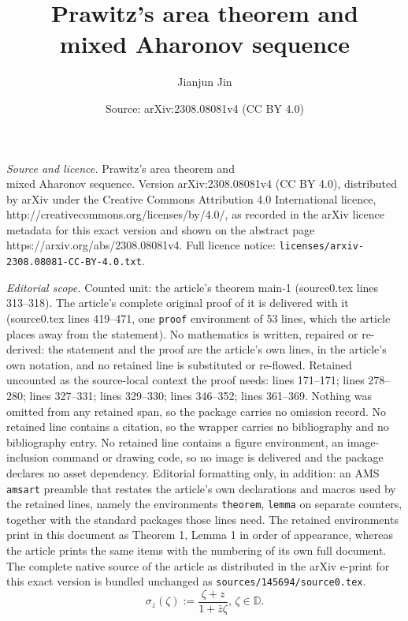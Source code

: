 \documentclass[10pt,a4paper]{amsart}
\title{Prawitz's area theorem and \\ mixed Aharonov sequence}
\author{Jianjun Jin}
\date{Source: arXiv:2308.08081v4 (CC BY 4.0)}
\begin{document}
\maketitle

\noindent\emph{Source and licence.} Prawitz's area theorem and \\ mixed Aharonov sequence. Version arXiv:2308.08081v4 (CC BY 4.0), distributed by arXiv under the Creative Commons Attribution 4.0 International licence, http://creativecommons.org/licenses/by/4.0/, as recorded in the arXiv licence metadata for this exact version and shown on the abstract page https://arxiv.org/abs/2308.08081v4. Full licence notice: \texttt{licenses/arxiv-2308.08081-CC-BY-4.0.txt}.\par\smallskip

\noindent\textit{Editorial scope.} Counted unit: the article's theorem main-1 (source0.tex lines 313--318). The article's complete original proof of it is delivered with it (source0.tex lines 419--471, one \texttt{proof} environment of 53 lines, which the article places away from the statement). No mathematics is written, repaired or re-derived: the statement and the proof are the article's own lines, in the article's own notation, and no retained line is substituted or re-flowed.  Retained uncounted as the source-local context the proof needs: lines 171--171; lines 278--280; lines 327--331; lines 329--330; lines 346--352; lines 361--369.  Nothing was omitted from any retained span, so the package carries no omission record.  No retained line contains a citation, so the wrapper carries no bibliography and no bibliography entry.  No retained line contains a figure environment, an image-inclusion command or drawing code, so no image is delivered and the package declares no asset dependency.  Editorial formatting only, in addition: an AMS \texttt{amsart} preamble that restates the article's own declarations and macros used by the retained lines, namely the environments \texttt{theorem}, \texttt{lemma} on separate counters, together with the standard packages those lines need.  The retained environments print in this document as Theorem 1, Lemma 1 in order of appearance, whereas the article prints the same items with the numbering of its own full document.  The complete native source of the article as distributed in the arXiv e-print for this exact version is bundled unchanged as \texttt{sources/145694/source0.tex}.
\begin{equation}\label{sigma}\sigma_{z}(\zeta):=\frac{\zeta+z}{1+\bar{z}\zeta}, \, \zeta \in \mathbb{D}.\end{equation}
\end{document}
